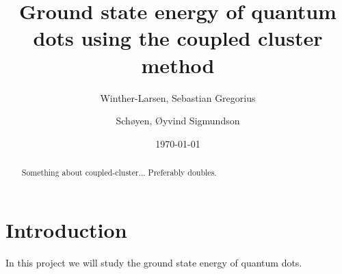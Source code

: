 \documentclass[
    a4paper, aps, twocolumn, floatfix, superscriptaddress,
    nofootinbib]{revtex4-1}
\newcommand{\1}{\mathds{1}}
\begin{document}
\title{Ground state energy of quantum dots using the coupled cluster method}
\author{Winther-Larsen, Sebastian Gregorius}
\author{Schøyen, Øyvind Sigmundson}
\date{\today}

\begin{abstract}
    Something about coupled-cluster... Preferably doubles.
\end{abstract}

\maketitle
\tableofcontents


\section{Introduction}
    In this project we will study the ground state energy of quantum dots.
\end{document}
